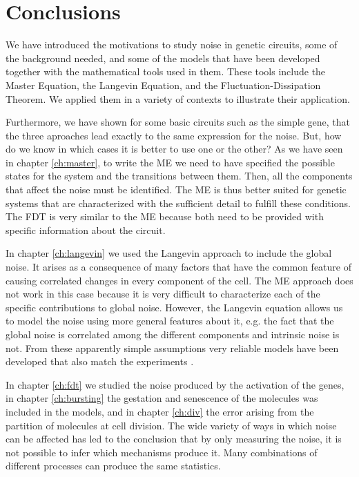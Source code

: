 \chapter*{Conclusions}

We have introduced the motivations to study noise in genetic circuits, some of the background needed, and some of the models that have been developed together with the mathematical tools used in them. These tools include the Master Equation, the Langevin Equation, and the Fluctuation-Dissipation Theorem. We applied them in a variety of contexts to illustrate their application.

Furthermore, we have shown for some basic circuits such as the simple gene, that the three aproaches lead exactly to the same expression for the noise. But, how do we know in which cases it is better to use one or the other? As we have seen in chapter \ref{ch:master}, to write the ME we need to have specified the possible states for the system and the transitions between them. Then, all the components that affect the noise must be identified. The ME is thus better suited for genetic systems that are characterized with the sufficient detail to fulfill these conditions. The FDT is very similar to the ME because both need to be provided with specific information about the circuit.

In chapter \ref{ch:langevin} we used the Langevin approach to include the global noise. It arises as a consequence of many factors that have the common feature of causing correlated changes in every component of the cell. The ME approach does not work in this case because it is very difficult to characterize each of the specific contributions to global noise. However, the Langevin equation allows us to model the noise using more general features about it, e.g. the fact that the global noise is correlated among the different components and intrinsic noise is not. From these apparently simple assumptions very reliable models have been developed that also match the experiments \cite{pedraza05}.

In chapter \ref{ch:fdt} we studied the noise produced by the activation of the genes, in chapter \ref{ch:bursting} the gestation and senescence of the molecules was included in the models, and in chapter \ref{ch:div} the error arising from the partition of molecules at cell division. The wide variety of ways in which noise can be affected has led to the conclusion that by only measuring the noise, it is not possible to infer which mechanisms produce it. Many combinations of different processes can produce the same statistics.

